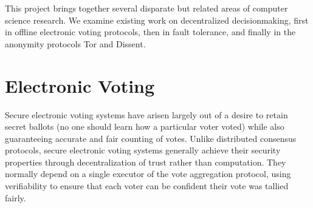 %
%
%
This project brings together several disparate but related areas of computer
science research. We examine existing work on decentralized decisionmaking,
first in offline electronic voting protocols, then in fault tolerance, and
finally in the anonymity protocols Tor and Dissent.
%
  \section{Electronic Voting} \label{Subsection:evoting}
    Secure electronic voting systems have arisen largely out of a desire to
    retain secret ballots (no one should learn how a particular voter voted)
    while also guaranteeing accurate and fair counting of votes. Unlike
    distributed consensus protocols, secure electronic voting systems generally
    achieve their security properties through decentralization of trust rather
    than computation. They normally depend on a single executor of the vote
    aggregation protocol, using verifiability to ensure that each voter can be
    confident their vote was tallied fairly.

